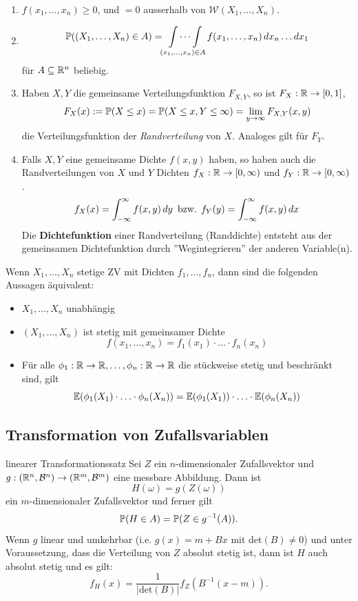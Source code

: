 \begin{enumerate}
    \item $f(x_1, \ldots, x_n) \geq 0$, und $ = 0$ ausserhalb von $\mathcal{W}(X_1, \ldots, X_n)$.
    \item 
    \begin{gather*}
        \P((X_1, \ldots, X_n) \in A) = \idotsint\limits_{(x_1, \ldots, x_n) \in A} f(x_1, \ldots, x_n) \mathop{dx_n}\ldots\mathop{dx_1}
    \end{gather*}
    für $A \subseteq \R^n$ beliebig.
    \item Haben $X, Y$ die gemeinsame Verteilungsfunktion $F_{X,Y}$, so ist $F_X: \R \to [0,1]$,
    $$F_X(x) := \P(X \leq x) = \P(X \leq x, Y \leq \infty) = \lim_{y \to \infty}F_{X,Y}(x,y)$$
    die Verteilungsfunktion der \textit{Randverteilung} von $X$. Analoges gilt für $F_Y$.
    \item Falls $X,Y$ eine gemeinsame Dichte $f(x,y)$ haben, so haben auch die Randverteilungen von $X$ und $Y$ Dichten $f_X: \R \to [0, \infty)$ und $f_Y: \R \to [0, \infty)$.
    $$f_X(x) = \int_{-\infty}^{\infty}f(x,y)\mathop{dy} \text{ bzw. } f_Y(y)=\int_{-\infty}^{\infty}f(x,y)\dx$$
    Die \textbf{Dichtefunktion} einer Randverteilung (Randdichte) entsteht aus der gemeinsamen Dichtefunktion durch ''Wegintegrieren'' der anderen Variable(n).
\end{enumerate}
Wenn $X_1, \ldots, X_n$ stetige ZV mit Dichten $f_1, \ldots, f_n$, dann sind die folgenden Aussagen äquivalent:
\begin{itemize}
    \item $X_1, \ldots, X_n$ unabhängig
    \item $(X_1, \ldots, X_n)$ ist stetig mit gemeinsamer Dichte $$f(x_1, \ldots, x_n) = f_1(x_1) \cdot \ldots \cdot f_n(x_n)$$
    \item Für alle $\phi_1: \R \to \R, \ldots, \phi_n: \R \to \R$ die stückweise stetig und beschränkt sind, gilt 
    $$\E(\phi_1(X_1)\cdot \ldots \cdot \phi_n(X_n)) = \E(\phi_1(X_1)) \cdot \ldots \cdot \E(\phi_n(X_n))$$
\end{itemize}
\subsection{Transformation von Zufallsvariablen}
\begin{subbox}{linearer Transformationssatz}
    Sei $Z$ ein $n$-dimensionaler Zufallsvektor und $g: (\R^n, \mathcal{B}^n) \to (\R^m, \mathcal{B}^m)$ eine messbare Abbildung. Dann ist
    $$H(\omega) = g(Z(\omega))$$
    ein $m$-dimensionaler Zufallsvektor und ferner gilt
    $$\P(H \in A) = \P(Z \in g^{-1}(A)).$$
    Wenn $g$ linear und umkehrbar (i.e. $g(x) = m + Bx$ mit det$(B) \neq 0$) und unter Voraussetzung, dass die Verteilung von $Z$ absolut stetig ist, dann ist $H$ auch absolut stetig und es gilt:
    $$f_H(x)=\frac{1}{|\text{det}(B)|}f_Z(B^{-1}(x-m)).$$
\end{subbox}
